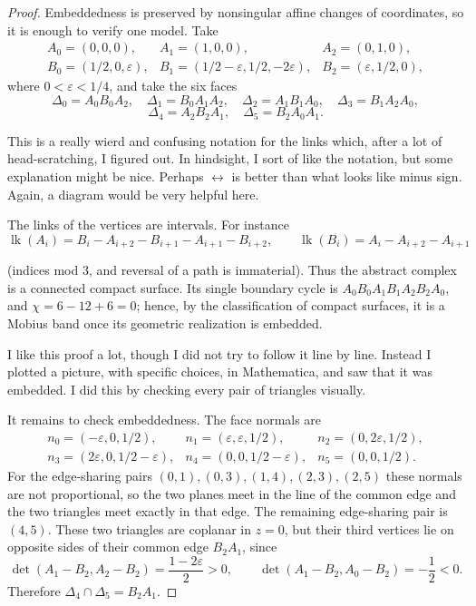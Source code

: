 \documentclass[12pt]{article}
\newcommand{\review}[1]{\begin{reviewbox}#1\end{reviewbox}}
\begin{document}
\begin{proof}
Embeddedness is preserved by nonsingular affine changes of coordinates,
so it is enough to verify one model.  Take
\[
\begin{array}{lll}
A_0=(0,0,0),& A_1=(1,0,0),& A_2=(0,1,0),\\
B_0=(1/2,0,\varepsilon),&
B_1=(1/2-\varepsilon,1/2,-2\varepsilon),&
B_2=(\varepsilon,1/2,0),
\end{array}
\]
where \(0<\varepsilon<1/4\), and take the six faces
\[
\Delta_0=A_0B_0A_2,\quad \Delta_1=B_0A_1A_2,\quad
\Delta_2=A_1B_1A_0,\quad \Delta_3=B_1A_2A_0,
\]
\[
\Delta_4=A_2B_2A_1,\quad \Delta_5=B_2A_0A_1 .
\]


\review{This is a really wierd and confusing notation for the links which, after a lot of head-scratching, I figured out. In hindsight, I sort of like the notation, but some explanation might be nice. Perhaps $\leftrightarrow$ is better than what looks like  minus sign.  Again, a diagram would be very helpful here.}

The links of the vertices are intervals.  For instance
\[
 \operatorname{lk}(A_i)=
 B_i-A_{i+2}-B_{i+1}-A_{i+1}-B_{i+2},\qquad
 \operatorname{lk}(B_i)=A_i-A_{i+2}-A_{i+1}
\]




(indices mod \(3\), and reversal of a path is immaterial).  Thus the
abstract complex is a connected compact surface.  Its single boundary
cycle is \(A_0B_0A_1B_1A_2B_2A_0\), and
\(\chi=6-12+6=0\); hence, by the classification of compact surfaces, it
is a Mobius band once its geometric realization is embedded.


\review{I like this proof a lot, though I did not try to follow it line by line. Instead I plotted a picture, with specific choices, in Mathematica, and saw that it was embedded.  I did this by checking every pair of triangles visually.}


It remains to check embeddedness.  The face normals are
\[
\begin{array}{lll}
n_0=(-\varepsilon,0,1/2),&
n_1=(\varepsilon,\varepsilon,1/2),&
n_2=(0,2\varepsilon,1/2),\\
n_3=(2\varepsilon,0,1/2-\varepsilon),&
n_4=(0,0,1/2-\varepsilon),&
n_5=(0,0,1/2).
\end{array}
\]
For the edge-sharing pairs
\((0,1),(0,3),(1,4),(2,3),(2,5)\) these normals are not proportional, so
the two planes meet in the line of the common edge and the two triangles
meet exactly in that edge.  The remaining edge-sharing pair is
\((4,5)\).  These two triangles are coplanar in \(z=0\), but their third
vertices lie on opposite sides of their common edge \(B_2A_1\), since
\[
 \det(A_1-B_2,A_2-B_2)=\frac{1-2\varepsilon}{2}>0,\qquad
 \det(A_1-B_2,A_0-B_2)=-\frac{1}{2}<0 .
\]
Therefore \(\Delta_4\cap\Delta_5=B_2A_1\).


\end{proof}
\end{document}
